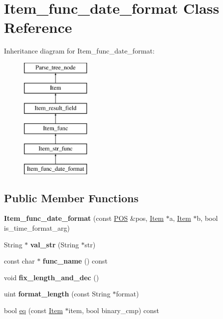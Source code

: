 \hypertarget{classItem__func__date__format}{}\section{Item\+\_\+func\+\_\+date\+\_\+format Class Reference}
\label{classItem__func__date__format}
Inheritance diagram for Item\+\_\+func\+\_\+date\+\_\+format\+:\begin{figure}[H]
\begin{center}
\leavevmode
\includegraphics[height=6.000000cm]{classItem__func__date__format}
\end{center}
\end{figure}
\subsection*{Public Member Functions}
\begin{DoxyCompactItemize}
\item 
\mbox{\label{classItem__func__date__format_aa9428b2e5f18632d265469900a71958e}} 
{\bfseries Item\+\_\+func\+\_\+date\+\_\+format} (const \mbox{\hyperlink{structYYLTYPE}{P\+OS}} \&pos, \mbox{\hyperlink{classItem}{Item}} $\ast$a, \mbox{\hyperlink{classItem}{Item}} $\ast$b, bool is\+\_\+time\+\_\+format\+\_\+arg)
\item 
\mbox{\label{classItem__func__date__format_a6f74e4af82d336663c83a69f2ba9c6e5}} 
String $\ast$ {\bfseries val\+\_\+str} (String $\ast$str)
\item 
\mbox{\label{classItem__func__date__format_a179c9972e7f2e27f7dc0b82fe782ec5d}} 
const char $\ast$ {\bfseries func\+\_\+name} () const
\item 
\mbox{\label{classItem__func__date__format_a1faa0f7200f118ec45688f7f267f7a28}} 
void {\bfseries fix\+\_\+length\+\_\+and\+\_\+dec} ()
\item 
\mbox{\label{classItem__func__date__format_a969ca053234d7afe92577aec124d533d}} 
uint {\bfseries format\+\_\+length} (const String $\ast$format)
\item 
bool \mbox{\hyperlink{classItem__func__date__format_a28846e4dfbb3bb5ea2eeddc387929abe}{eq}} (const \mbox{\hyperlink{classItem}{Item}} $\ast$item, bool binary\+\_\+cmp) const
\end{DoxyCompactItemize}
